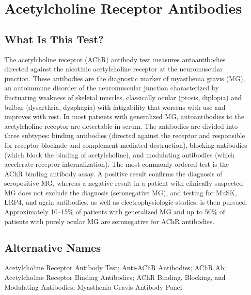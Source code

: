 \chapter{Acetylcholine Receptor Antibodies}

\section*{What Is This Test?}
The acetylcholine receptor (AChR) antibody test measures autoantibodies directed against the nicotinic acetylcholine receptor at the neuromuscular junction. These antibodies are the diagnostic marker of myasthenia gravis (MG), an autoimmune disorder of the neuromuscular junction characterized by fluctuating weakness of skeletal muscles, classically ocular (ptosis, diplopia) and bulbar (dysarthria, dysphagia) with fatigability that worsens with use and improves with rest. In most patients with generalized MG, autoantibodies to the acetylcholine receptor are detectable in serum. The antibodies are divided into three subtypes: binding antibodies (directed against the receptor and responsible for receptor blockade and complement-mediated destruction), blocking antibodies (which block the binding of acetylcholine), and modulating antibodies (which accelerate receptor internalization). The most commonly ordered test is the AChR binding antibody assay. A positive result confirms the diagnosis of seropositive MG, whereas a negative result in a patient with clinically suspected MG does not exclude the diagnosis (seronegative MG), and testing for MuSK, LRP4, and agrin antibodies, as well as electrophysiologic studies, is then pursued. Approximately 10--15\% of patients with generalized MG and up to 50\% of patients with purely ocular MG are seronegative for AChR antibodies.

\section*{Alternative Names}
Acetylcholine Receptor Antibody Test; Anti-AChR Antibodies; AChR Ab; Acetylcholine Receptor Binding Antibodies; AChR Binding, Blocking, and Modulating Antibodies; Myasthenia Gravis Antibody Panel

